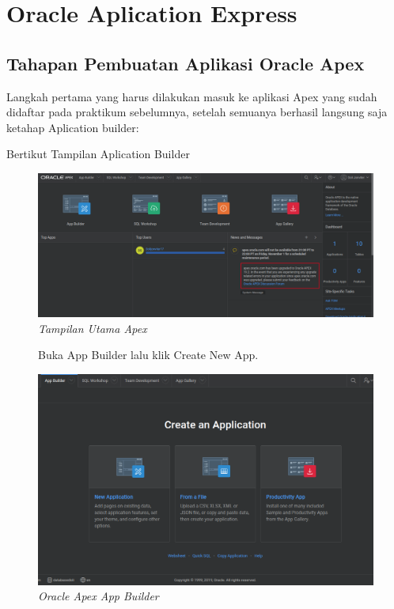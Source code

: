 \chapter{Oracle Aplication Express}


\section{Tahapan Pembuatan Aplikasi Oracle Apex}
Langkah pertama yang harus dilakukan masuk ke aplikasi Apex yang sudah didaftar pada praktikum sebelumnya, setelah semuanya berhasil langsung saja ketahap Aplication builder:
\begin{enumerate}
\item[1]Bertikut Tampilan Aplication Builder

\begin{figure}[!htbp]

    \begin{center}
        \includegraphics[scale=0.3]{figures/halamanApex.png}
        \caption{\textit{Tampilan Utama Apex}}
        \end{center}   
        \end{figure}
        \begin{figure}[!htbp]


\item[2] Buka App Builder lalu klik Create New App.

    \begin{center}
\includegraphics[scale=0.4]{figures/createAppFromfile.png}
    \caption{\textit{Oracle Apex App Builder}}
        \end{center}
\label{gambar}
\end{figure}


\end{enumerate}

